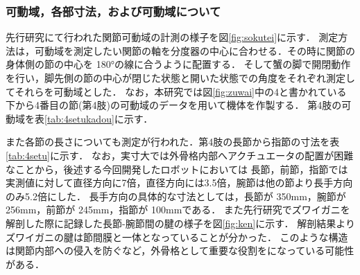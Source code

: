 \subsubsection{可動域，各部寸法，および可動域について}
先行研究\cite{hasegawa}にて行われた関節可動域の計測の様子を図\ref{fig:sokutei}に示す．
測定方法は，可動域を測定したい関節の軸を分度器の中心に合わせる．その時に関節の身体側の節の中心を 180°の線に合うように配置する．
そして蟹の脚で開閉動作を行い，脚先側の節の中心が閉じた状態と開いた状態での角度をそれぞれ測定してそれらを可動域とした．
なお，本研究では図\ref{fig:zuwai}中の4と書かれている下から4番目の節(第4肢)の可動域のデータを用いて機体を作製する．
第4肢の可動域を表\ref{tab:4setukadou}に示す．

また各節の長さについても測定が行われた．第4肢の長節から指節の寸法を表\ref{tab:4setu}に示す．
なお，実寸大では外骨格内部へアクチュエータの配置が困難なことから，後述する今回開発したロボットにおいては
長節，前節，指節では実測値に対して直径方向に7倍，直径方向には3.5倍，腕節は他の節より長手方向のみ5.2倍にした．
長手方向の具体的な寸法としては，長節が 350mm，腕節が 256mm，前節が 245mm，指節が 100mmである．
また先行研究\cite{hasegawa}でズワイガニを解剖した際に記録した長節-腕節間の腱の様子を図\ref{fig:ken}に示す．
解剖結果よりズワイガニの腱は節間膜と一体となっていることが分かった\cite{hasegawa}．
このような構造は関節内部への侵入を防ぐなど，外骨格として重要な役割をになっている可能性がある．
\begin{table}[t]
  \centering
  \vspace{5mm}
  \caption{第4肢の節間の可動域}
  \label{tab:4setukadou}
  \vspace{-3mm}
\end{table}
